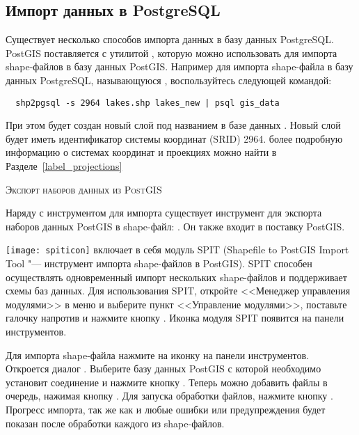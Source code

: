 
\subsection{Импорт данных в PostgreSQL}\label{sec:loading_postgis_data}

Существует несколько способов импорта данных в базу данных PostgreSQL. PostGIS
поставляется с утилитой , которую можно использовать для
импорта shape-файлов в базу данных PostGIS. Например для импорта shape-файла
 в базу данных PostgreSQL, называющуюся
, воспользуйтесь следующей командой:

\begin{verbatim}
  shp2pgsql -s 2964 lakes.shp lakes_new | psql gis_data
\end{verbatim}

При этом будет создан новый слой под названием  в
базе данных . Новый слой будет иметь идентификатор
системы координат (SRID) 2964. более подробную информацию о системах координат
и проекциях можно найти в Разделе~\ref{label_projections}
\begin{Tip}
\caption{\textsc{Экспорт наборов данных из PostGIS}}
Наряду с инструментом для импорта  существует инструмент
для экспорта наборов данных PostGIS в shape-файл: .
Он также входит в поставку PostGIS.
\end{Tip}

\texttt{[image: spiticon]} \qg включает в себя модуль
SPIT (Shapefile to PostGIS Import Tool "--- инструмент импорта shape-файлов
в PostGIS). SPIT способен осуществлять одновременный
импорт нескольких shape-файлов и поддерживает схемы баз данных. Для
использования SPIT, откройте <<Менеджер управления модулями>> \qg в меню
 и выберите пункт <<Управление модулями>>, поставьте
галочку напротив  и нажмите кнопку . Иконка
модуля SPIT появится на панели инструментов.

Для импорта shape-файла нажмите на иконку 
на панели инструментов. \\
Откроется диалог .
Выберите базу данных PostGIS с которой необходимо установит соединение и
нажмите кнопку . Теперь можно добавить файлы в
очередь, нажимая кнопку . Для запуска обработки файлов,
нажмите кнопку . Прогресс импорта, так же как и любые ошибки
или предупреждения будет показан после обработки каждого из shape-файлов.


